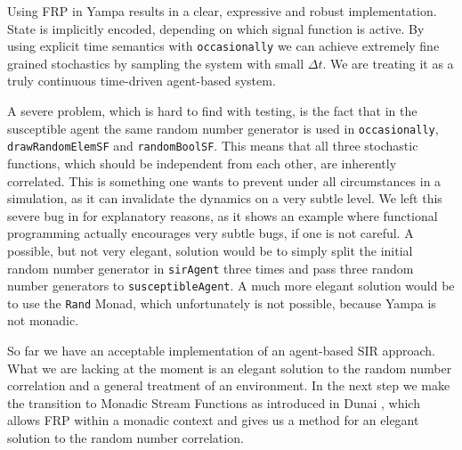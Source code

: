 Using FRP in Yampa results in a clear, expressive and robust implementation. State is implicitly encoded, depending on which signal function is active. By using explicit time semantics with \texttt{occasionally} we can achieve extremely fine grained stochastics by sampling the system with small $\Delta t$. We are treating it as a truly continuous time-driven agent-based system.

A severe problem, which is hard to find with testing, is the fact that in the susceptible agent the same random number generator is used in \texttt{occasionally}, \texttt{drawRandomElemSF} and \texttt{randomBoolSF}. This means that all three stochastic functions, which should be independent from each other, are inherently correlated. This is something one wants to prevent under all circumstances in a simulation, as it can invalidate the dynamics on a very subtle level. We left this severe bug in for explanatory reasons, as it shows an example where functional programming actually encourages very subtle bugs, if one is not careful. A possible, but not very elegant, solution would be to simply split the initial random number generator in \texttt{sirAgent} three times and pass three random number generators to \texttt{susceptibleAgent}. A much more elegant solution would be to use the \texttt{Rand} Monad, which unfortunately is not possible, because Yampa is not monadic.

So far we have an acceptable implementation of an agent-based SIR approach. What we are lacking at the moment is an elegant solution to the random number correlation and a general treatment of an environment. In the next step we make the transition to Monadic Stream Functions as introduced in Dunai \cite{perez_functional_2016}, which allows FRP within a monadic context and gives us a method for an elegant solution to the random number correlation.